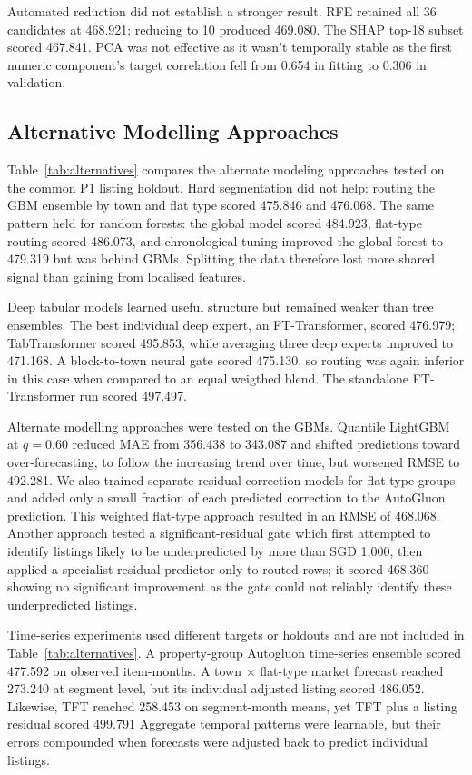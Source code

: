 \documentclass[conference]{IEEEtran}
\newif\ifshowsrc
\newcommand{\src}[1]{\ifshowsrc\textsuperscript{\tiny\color{gray}[#1]}\fi}
\begin{document}
Automated reduction did not establish a stronger result. RFE retained all 36 candidates at 468.921; 
reducing to 10 produced 469.080. The SHAP top-18 subset scored 467.841. 
PCA was not effective as it wasn't temporally stable as the first numeric component's target correlation fell from 0.654 in fitting to 0.306 in validation.\src{Me-fs-auto,Me-dim}



\subsection{Alternative Modelling Approaches}
Table~\ref{tab:alternatives} compares the alternate modeling approaches tested on the common P1 listing holdout.
Hard segmentation did not help: routing the GBM ensemble by town and flat type scored 475.846 and 476.068.
The same pattern held for random forests: the global model scored 484.923, flat-type routing scored 486.073, and chronological tuning improved the global forest to 479.319 but was behind GBMs.
Splitting the data therefore lost more shared signal than gaining from localised features.\src{Me-seg,Me-alt}

Deep tabular models learned useful structure but remained weaker than tree ensembles. The best individual deep expert, 
an FT-Transformer, scored 476.979; TabTransformer scored 495.853, while averaging three deep experts improved to 471.168. 
A block-to-town neural gate scored 475.130, so routing was again inferior in this case when compared to an equal weigthed blend. 
The standalone FT-Transformer run scored 497.497.\src{Me-res,Me-trendres,Me-alt}

Alternate modelling approaches were tested on the GBMs. Quantile LightGBM at $q{=}0.60$ reduced MAE from 356.438 to 343.087 
and shifted predictions toward over-forecasting, to follow the increasing trend over time, but worsened RMSE to 492.281. 
We also trained separate residual correction models for flat-type groups and added only a small fraction of each 
predicted correction to the AutoGluon prediction. This weighted flat-type approach resulted in an RMSE of 468.068.
Another approach tested a significant-residual gate which first attempted to identify listings 
likely to be underpredicted by more than SGD 1,000, then applied a specialist residual predictor only to routed rows; it scored 468.360 
showing no significant improvement as the gate could not reliably identify these underpredicted listings.\src{Me-alt}

Time-series experiments used different targets or holdouts and are not included in Table~\ref{tab:alternatives}. A property-group Autogluon time-series ensemble scored 477.592 
on observed item-months. A town $\times$ flat-type market forecast reached 273.240 at segment level, but its individual adjusted listing scored 486.052. Likewise, TFT reached 258.453 on segment-month means, 
yet TFT plus a listing residual scored 499.791
Aggregate temporal patterns were learnable, but their errors compounded when forecasts were adjusted back to predict individual listings.\src{Me-tft,Me-alt}
\end{document}
